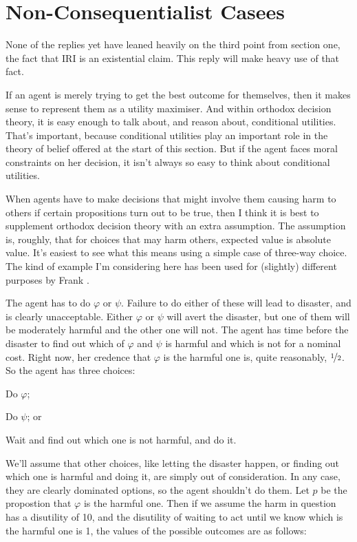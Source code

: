 \documentclass[11pt,oneside]{book}
\begin{document}
\section{Non-Consequentialist Casees}
None of the replies yet have leaned heavily on the third point from section one, the fact that IRI is an existential claim. This reply will make heavy use of that fact.

If an agent is merely trying to get the best outcome for themselves, then it makes sense to represent them as a utility maximiser. And within orthodox decision theory, it is easy enough to talk about, and reason about, conditional utilities. That's important, because conditional utilities play an important role in the theory of belief offered at the start of this section. But if the agent faces moral constraints on her decision, it isn't always so easy to think about conditional utilities.

When agents have to make decisions that might involve them causing harm to others if certain propositions turn out to be true, then I think it is best to supplement orthodox decision theory with an extra assumption. The assumption is, roughly, that for choices that may harm others, expected value is absolute value. It's easiest to see what this means using a simple case of three-way choice. The kind of example I'm considering here has been used for (slightly) different purposes by Frank \cite{Jackson1991}. 

The agent has to do \(\varphi\) or \(\psi\). Failure to do either of these will lead to disaster, and is clearly unacceptable. Either \(\varphi\) or \(\psi\) will avert the disaster, but one of them will be moderately harmful and the other one will not. The agent has time before the disaster to find out which of \(\varphi\) and \(\psi\) is harmful and which is not for a nominal cost. Right now, her credence that \(\varphi\) is the harmful one is, quite reasonably, \(\nicefrac{1}{2}\). So the agent has three choices:

\begin{itemize*}
\item Do \(\varphi\);
\item Do \(\psi\); or
\item Wait and find out which one is not harmful, and do it.
\end{itemize*}

\noindent We'll assume that other choices, like letting the disaster happen, or finding out which one is harmful and doing it, are simply out of consideration. In any case, they are clearly dominated options, so the agent shouldn't do them. Let \(p\) be the propostion that \(\varphi\) is the harmful one. Then if we assume the harm in question has a disutility of 10, and the disutility of waiting to act until we know which is the harmful one is 1, the values of the possible outcomes are as follows:
\end{document}
